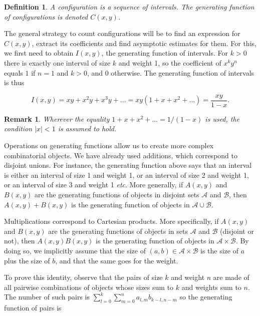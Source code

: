 \documentclass{article}
\newtheorem{definition}{Definition}
\newtheorem*{remark}{Remark}
\begin{document}
\begin{definition}
A configuration is a sequence of intervals. The generating function of
configurations is denoted $C(x,y)$.
\end{definition}

The general strategy to count configurations will be to find an expression
for $C(x,y)$, extract its coefficients and find asymptotic estimates for
them. For this, we first need to obtain $I(x,y)$, the generating function
of intervals. For $k > 0$ there is exactly one interval of size $k$ and
weight 1, so the coefficient of $x^ky^n$ equals $1$ if $n = 1$ and $k >
0$, and $0$ otherwise. The generating function of intervals is thus

\begin{equation}
\label{eq:F}
I(x,y) = xy + x^2y + x^3y + \ldots
= xy(1+x+x^2+\ldots) = \frac{xy}{1-x}.
\end{equation}

\begin{remark}
Wherever the equality $1+x+x^2+\ldots = 1/(1-x)$ is used, the condition
$|x| < 1$ is assumed to hold.
\end{remark}

Operations on generating functions allow us to create more complex
combinatorial objects. We have already used additions, which correspond
to disjoint unions. For instance, the generating function above says that
an interval is either an interval of size 1 and weight 1, or an interval
of size 2 and weight 1, or an interval of size 3 and weight 1
\textit{etc}. More generally, if $A(x,y)$ and $B(x,y)$ are the generating
functions of objects in disjoint sets $\mathcal{A}$ and $\mathcal{B}$,
then $A(x,y)+B(x,y)$ is the generating function of objects in $\mathcal{A}
\cup \mathcal{B}$.

Multiplications correspond to Cartesian products. More specifically, if
$A(x,y)$ and $B(x,y)$ are the generating functions of objects in sets
$\mathcal{A}$ and $\mathcal{B}$ (disjoint or not), then $A(x,y)B(x,y)$ is
the generating function of objects in $\mathcal{A} \times \mathcal{B}$.
By doing so, we implicitly assume that the size of $(a,b) \in \mathcal{A}
\times \mathcal{B}$ is the size of $a$ plus the size of $b$, and that the
same goes for the weight.

To prove this identity, observe that the pairs of size $k$ and weight $n$
are made of all pairwise combinations of objects whose sizes sum to $k$
and weights sum to $n$. The number of such pairs is $\sum_{l=0}^k
\sum_{m=0}^n a_{l,m}b_{k-l,n-m}$ so the generating function of pairs is
\end{document}
